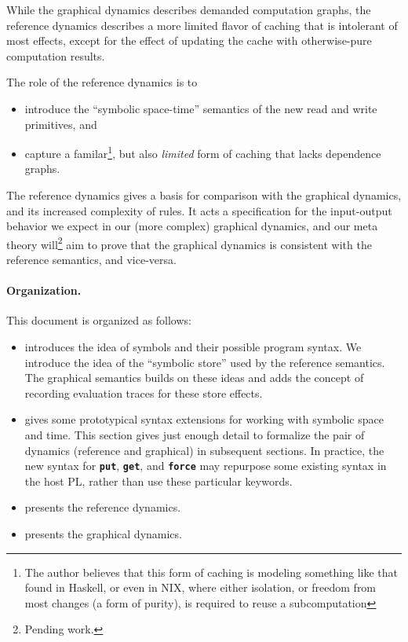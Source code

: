 \documentclass[11pt]{article}
\renewcommand{\ottkw}[1]{\textbf{\texttt{#1}}}
\begin{document}
While the graphical dynamics describes demanded computation graphs, the
reference dynamics describes a more limited flavor of caching that is
intolerant of most effects, except for the effect of updating the
cache with otherwise-pure computation results.

The role of the reference dynamics is to \begin{itemize}
  \item[(1)] introduce the ``symbolic space-time'' semantics
    of the new read and write primitives, and
  \item[(2)] capture a familar\footnote{The author believes that this form of caching is modeling something like that found in Haskell, or even in NIX, where either isolation, or freedom from most changes (a form of purity), is required to reuse a subcomputation}, but also \emph{limited}
    form of caching that lacks dependence graphs.
\end{itemize}

The reference dynamics gives a basis for comparison with the graphical dynamics, and its increased complexity of rules.
    It acts a specification for the input-output behavior we expect in our (more complex) graphical dynamics,
    and our meta theory will\footnote{Pending work.} aim to prove that the graphical dynamics is consistent with the reference semantics, and vice-versa.

\paragraph{Organization.}
This document is organized as follows:

\begin{itemize}

\item {} introduces the idea of
  symbols and their possible program syntax.  We introduce the idea of
  the ``symbolic store'' used by the reference semantics.  The
  graphical semantics builds on these ideas and adds the concept of
  recording evaluation traces for these store effects.

\item {} gives some prototypical syntax
  extensions for working with symbolic space and time.
  This section gives just enough detail to
  formalize the pair of dynamics (reference and graphical) in
  subsequent sections.
  In practice,
  the new syntax for \ottkw{put}, \ottkw{get}, and \ottkw{force} may
  repurpose some existing syntax in the host PL, rather than use these
  particular keywords.

\item {} presents the reference dynamics.

\item {} presents the graphical dynamics.

\end{itemize}
\end{document}

